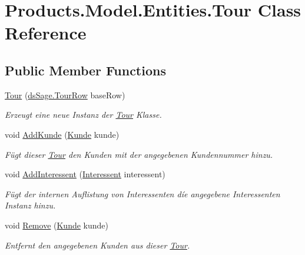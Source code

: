 \hypertarget{class_products_1_1_model_1_1_entities_1_1_tour}{}\section{Products.\+Model.\+Entities.\+Tour Class Reference}
\label{class_products_1_1_model_1_1_entities_1_1_tour}
\subsection*{Public Member Functions}
\begin{DoxyCompactItemize}
\item 
\hyperlink{class_products_1_1_model_1_1_entities_1_1_tour_a0e393cf0bcae51a578bac77000c33648}{Tour} (\hyperlink{class_products_1_1_data_1_1ds_sage_1_1_tour_row}{ds\+Sage.\+Tour\+Row} base\+Row)
\begin{DoxyCompactList}\small\item\em Erzeugt eine neue Instanz der \hyperlink{class_products_1_1_model_1_1_entities_1_1_tour}{Tour} Klasse. \end{DoxyCompactList}\item 
void \hyperlink{class_products_1_1_model_1_1_entities_1_1_tour_ad5ac7f4a3d7a74facb0262fb06e405c8}{Add\+Kunde} (\hyperlink{class_products_1_1_model_1_1_entities_1_1_kunde}{Kunde} kunde)
\begin{DoxyCompactList}\small\item\em Fügt dieser \hyperlink{class_products_1_1_model_1_1_entities_1_1_tour}{Tour} den Kunden mit der angegebenen Kundennummer hinzu. \end{DoxyCompactList}\item 
void \hyperlink{class_products_1_1_model_1_1_entities_1_1_tour_a89a65b79a95b119ab948546d1f0d8b5e}{Add\+Interessent} (\hyperlink{class_products_1_1_model_1_1_entities_1_1_interessent}{Interessent} interessent)
\begin{DoxyCompactList}\small\item\em Fügt der internen Auflistung von Interessenten díe angegebene Interessenten Instanz hinzu. \end{DoxyCompactList}\item 
void \hyperlink{class_products_1_1_model_1_1_entities_1_1_tour_ab16ccc0c3a7449b890fe11b47d5869c4}{Remove} (\hyperlink{class_products_1_1_model_1_1_entities_1_1_kunde}{Kunde} kunde)
\begin{DoxyCompactList}\small\item\em Entfernt den angegebenen Kunden aus dieser \hyperlink{class_products_1_1_model_1_1_entities_1_1_tour}{Tour}. \end{DoxyCompactList}\end{DoxyCompactItemize}
